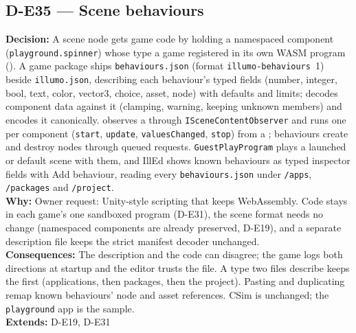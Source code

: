 \subsection*{D-E35 --- Scene behaviours}
\begin{decisionbox}[title={D-E35 \quad 2026-10-01}]
\textbf{Decision:} A scene node gets game code by holding a namespaced
component (\texttt{playground.spinner}) whose type a game registered in its
own WASM program (). A game package
ships \texttt{behaviours.json} (format \texttt{illumo-behaviours}~1) beside
\texttt{illumo.json}, describing each behaviour's typed fields (number,
integer, bool, text, color, vector3, choice, asset, node) with defaults and
limits;  decodes component data against it
(clamping, warning, keeping unknown members) and encodes it canonically.
 observes a  through
\texttt{ISceneContentObserver} and runs one  per
component (\texttt{start}, \texttt{update}, \texttt{valuesChanged},
\texttt{stop}) from a ; behaviours create and
destroy nodes through queued requests. \texttt{GuestPlayProgram} plays a
launched or default scene with them, and IllEd shows known behaviours as
typed inspector fields with Add behaviour, reading every
\texttt{behaviours.json} under \texttt{/apps}, \texttt{/packages} and
\texttt{/project}.\\
\textbf{Why:} Owner request: Unity-style scripting that keeps WebAssembly.
Code stays in each game's one sandboxed program (D-E31), the scene format
needs no change (namespaced components are already preserved, D-E19), and a
separate description file keeps the strict manifest decoder unchanged.\\
\textbf{Consequences:} The description and the code can disagree; the game
logs both directions at startup and the editor trusts the file. A type two
files describe keeps the first (applications, then packages, then the
project). Pasting and duplicating remap known behaviours' node and asset
references. CSim is unchanged; the \texttt{playground} app is the sample.\\
\textbf{Extends:} D-E19, D-E31
\end{decisionbox}

